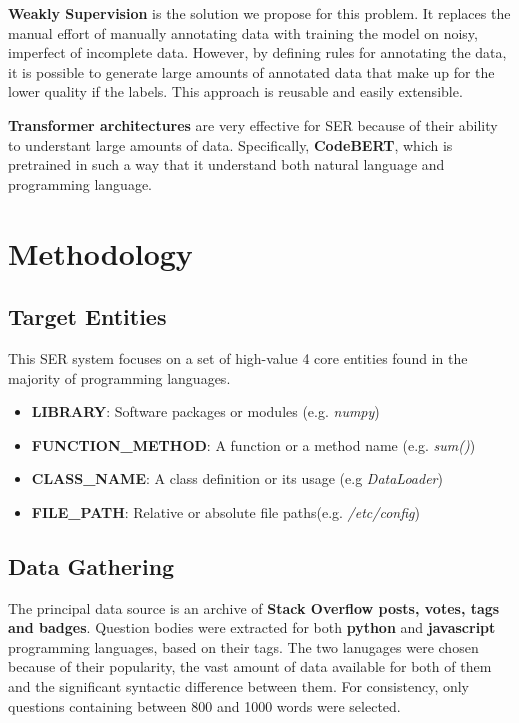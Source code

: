 \documentclass{article}
\begin{document}
\textbf{Weakly Supervision} is the solution we propose for this problem. It 
replaces the manual effort of manually annotating data with training the model 
on noisy, imperfect of incomplete data. However, by defining rules for annotating 
the data, it is possible to generate large amounts of annotated data that make 
up for the lower quality if the labels. This approach is reusable and easily 
extensible.

\textbf{Transformer architectures} are very effective for SER because of their 
ability to understant large amounts of data. Specifically, \textbf{CodeBERT}, 
which is pretrained in such a way that it understand both natural language and
programming language.

\section{Methodology}
\subsection{Target Entities}
This SER system focuses on a set of high-value 4 core entities found in the
majority of programming languages.

\begin{itemize}
    \item \textbf{LIBRARY}: Software packages or modules (e.g. \textit{numpy})
    \item \textbf{FUNCTION\_METHOD}: A function or a method name (e.g. \textit{sum()})
    \item \textbf{CLASS\_NAME}: A class definition or its usage (e.g \textit{DataLoader})
    \item \textbf{FILE\_PATH}: Relative or absolute file paths(e.g. \textit{/etc/config})
\end{itemize}

\subsection{Data Gathering}
\FloatBarrier
The principal data source is an archive of \textbf{Stack Overflow posts, votes,  
tags and badges}. Question bodies were extracted for both \textbf{python}
and \textbf{javascript} programming languages, based on their tags. The two 
lanugages were chosen because of their popularity, the vast amount of data 
available for both of them and the significant syntactic difference between them.
For consistency, only questions containing between 800 and 1000 words were selected.
\end{document}

